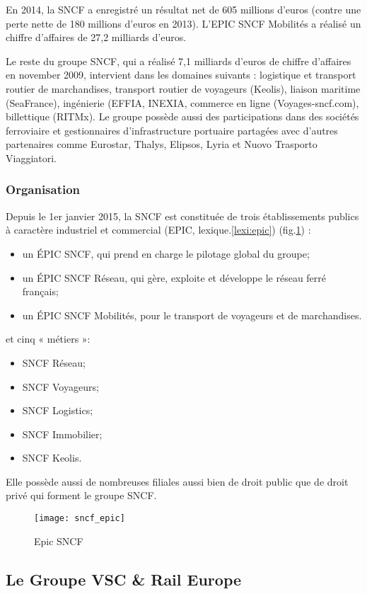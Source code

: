 En 2014, la SNCF a enregistré un résultat net de 605 millions d'euros (contre une perte nette de 180 millions d'euros en 2013). L'EPIC SNCF Mobilités a réalisé un chiffre d'affaires de 27,2 milliards d'euros.

Le reste du groupe SNCF, qui a réalisé 7,1 milliards d'euros de chiffre d'affaires en november 2009, intervient dans les domaines suivants : logistique et transport routier de marchandises, transport routier de voyageurs (Keolis), liaison maritime (SeaFrance), ingénierie (EFFIA, INEXIA, commerce en ligne (Voyages-sncf.com), billettique (RITMx). Le groupe possède aussi des participations dans des sociétés ferroviaire et gestionnaires d'infrastructure portuaire partagées avec d'autres partenaires comme Eurostar, Thalys, Elipsos, Lyria et Nuovo Trasporto Viaggiatori.

\subsubsection{Organisation}
Depuis le 1er janvier 2015,
la SNCF est constituée de trois établissements publics à caractère industriel et commercial (EPIC, lexique.\ref{lexi:epic}) (fig.\ref{fig:sncf_epic}) :
\begin{itemize}
 \item un ÉPIC SNCF, qui prend en charge le pilotage global du groupe;
 \item un ÉPIC SNCF Réseau, qui gère, exploite et développe le réseau ferré français;
 \item un ÉPIC SNCF Mobilités, pour le transport de voyageurs et de marchandises.
\end{itemize}
et cinq « métiers »:
\begin{itemize}
 \item SNCF Réseau;
 \item SNCF Voyageurs;
 \item SNCF Logistics;
 \item SNCF Immobilier;
 \item SNCF Keolis.
\end{itemize}

Elle possède aussi de nombreuses filiales aussi bien de droit public que de droit privé qui forment le groupe SNCF.

\begin{figure}[ht]
 \centering
 \texttt{[image: sncf\_epic]}
 \caption{Epic SNCF}
 \label{fig:sncf_epic}
\end{figure}

\subsection{Le Groupe VSC \& Rail Europe}
